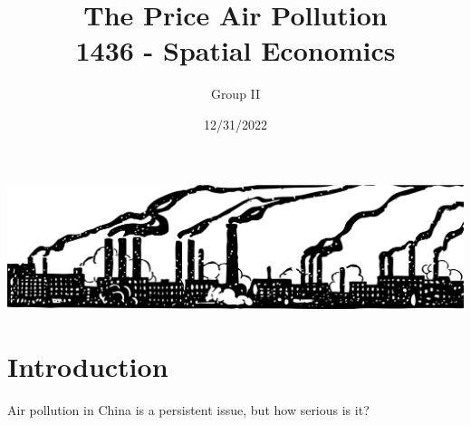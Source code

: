 \documentclass[]{article}
\title{The Price Air Pollution\\
1436 - Spatial Economics}
\author{Group II}
\date{12/31/2022}
\begin{document}
\maketitle

\begin{center}
\includegraphics[width = 380pt]{pollution.png} 
\end{center}
\thispagestyle{empty}
\begin{abstract}
	
\end{abstract}
\newpage
{}

\hypertarget{introduction}{%
\section{Introduction}\label{introduction}}
Air pollution in China is a persistent issue, but how serious is it?
\end{document}
